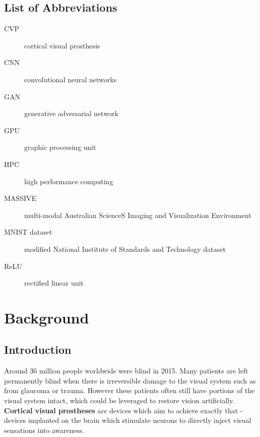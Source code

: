 \documentclass[a4paper,11pt,openany]{book}
\begin{document}
\clearpage

\setcounter{tocdepth}{3}
\tableofcontents

\chapter*{List of Abbreviations}

\begin{description}
\item[{CVP}] cortical visual prosthesis
\item[{CNN}] convolutional neural networks
\item[{GAN}] generative adversarial network
\item[{GPU}] graphic processing unit
\item[{HPC}] high performance computing
\item[{MASSIVE}] multi-modal Australian ScienceS Imaging and Visualization Environment
\item[{MNIST dataset}] modified National Institute of Standards and Technology dataset
\item[{ReLU}] rectified linear unit
\end{description}

\listoftables
\listoffigures

\part{Background}
\label{sec:orge952d5f}

\chapter{Introduction}
\label{sec:org1f793a5}

Around 36 million people worldwide were blind in 2015. \cite{bourne_magnitude_2017,flaxman_global_2017}
Many patients are left permanently blind when there is irreversible damage to the visual system such as from glaucoma or trauma. \cite{lee_glaucoma_2005,zachariades_blindness_1996}
However these patients often still have portions of the visual system intact, which could be leveraged to restore vision artificially.
\textbf{Cortical visual prostheses} are devices which aim to achieve exactly that - devices implanted on the brain which stimulate neurons to directly inject visual sensations into awareness. \cite{normann_toward_2009,lewis_restoration_2015,foroushani_cortical_2018}
\end{document}
